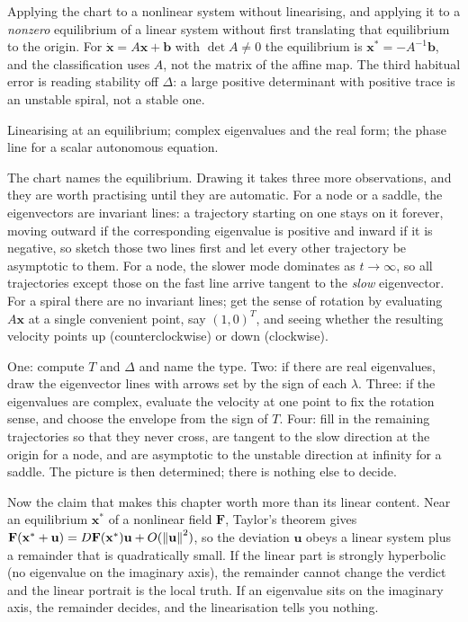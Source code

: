 \begin{trap}
Applying the chart to a nonlinear system without linearising, and applying it to a \emph{nonzero} equilibrium of a linear system without first translating that equilibrium to the origin. For $\dot{\mathbf{x}}=A\mathbf{x}+\mathbf{b}$ with $\det A\ne0$ the equilibrium is $\mathbf{x}^{*}=-A^{-1}\mathbf{b}$, and the classification uses $A$, not the matrix of the affine map. The third habitual error is reading stability off $\Delta$: a large positive determinant with positive trace is an unstable spiral, not a stable one.
\end{trap}

\begin{seealsob}Linearising at an equilibrium; complex eigenvalues and the real form; the phase line for a scalar autonomous equation.\end{seealsob}

The chart names the equilibrium. Drawing it takes three more observations, and they are worth practising until they are automatic. For a node or a saddle, the eigenvectors are invariant lines: a trajectory starting on one stays on it forever, moving outward if the corresponding eigenvalue is positive and inward if it is negative, so sketch those two lines first and let every other trajectory be asymptotic to them. For a node, the slower mode dominates as $t\to\infty$, so all trajectories except those on the fast line arrive tangent to the \emph{slow} eigenvector. For a spiral there are no invariant lines; get the sense of rotation by evaluating $A\mathbf{x}$ at a single convenient point, say $(1,0)^{T}$, and seeing whether the resulting velocity points up (counterclockwise) or down (clockwise).

\begin{keynote}
One: compute $T$ and $\Delta$ and name the type. Two: if there are real eigenvalues, draw the eigenvector lines with arrows set by the sign of each $\lambda$. Three: if the eigenvalues are complex, evaluate the velocity at one point to fix the rotation sense, and choose the envelope from the sign of $T$. Four: fill in the remaining trajectories so that they never cross, are tangent to the slow direction at the origin for a node, and are asymptotic to the unstable direction at infinity for a saddle. The picture is then determined; there is nothing else to decide.
\end{keynote}

Now the claim that makes this chapter worth more than its linear content. Near an equilibrium $\mathbf{x}^{*}$ of a nonlinear field $\mathbf{F}$, Taylor's theorem gives $\mathbf{F}(\mathbf{x}^{*}+\mathbf{u})=D\mathbf{F}(\mathbf{x}^{*})\mathbf{u}+O(\left\lVert \mathbf{u}\right\rVert^{2})$, so the deviation $\mathbf{u}$ obeys a linear system plus a remainder that is quadratically small. If the linear part is strongly hyperbolic (no eigenvalue on the imaginary axis), the remainder cannot change the verdict and the linear portrait is the local truth. If an eigenvalue sits on the imaginary axis, the remainder decides, and the linearisation tells you nothing.

